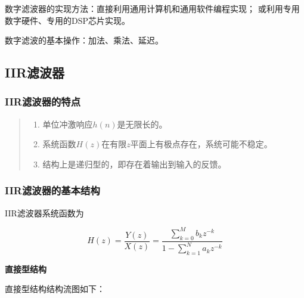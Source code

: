 \documentclass[cn, hazy, blue, normal, 12pt]{elegantnote}
\begin{document}
数字滤波器的实现方法：直接利用通用计算机和通用软件编程实现；
或利用专用数字硬件、专用的DSP芯片实现。

数字滤波的基本操作：加法、乘法、延迟。

\subsection{IIR滤波器}

\subsubsection{IIR滤波器的特点}

\begin{quote}
\begin{enumerate}
    \item 单位冲激响应$h(n)$是无限长的。
    \item 系统函数$H(z)$在有限$z$平面上有极点存在，系统可能不稳定。
    \item 结构上是递归型的，即存在着输出到输入的反馈。
\end{enumerate}
\end{quote}

\subsubsection{IIR滤波器的基本结构}

IIR滤波器系统函数为

\begin{equation}
    H(z)=\frac{Y(z)}{X(z)}=\frac{\sum\limits_{k=0}^{M}b_k z^{-k}}{1-\sum\limits_{k=1}^{N}a_k z^{-k}}
\end{equation}

\textbf{直接\uppercase\expandafter{}型结构}

直接\uppercase\expandafter{}型结构结构流图如下：
\end{document}
